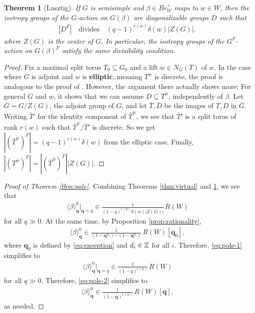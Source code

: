 \documentclass[a4paper,10pt,leqno]{amsart}
\theoremstyle{plain}
\theoremstyle{plain}
\newtheorem{thm}{Theorem}[subsection]
\theoremstyle{plain}
\theoremstyle{definition}
\theoremstyle{remark}
\newcommand{\dfemph}[1]{\textbf{#1}}
\newcommand{\Br}{\mathit{Br}}
\newcommand{\Q}{\bm{q}}
\newcommand{\Tr}[1]{\langle{#1}\rangle_{\Q}}
\begin{document}
\begin{thm}[Lusztig]\label{thm:isotropy}
If $G$ is semisimple and $\beta \in \Br_W^+$ maps to $w \in W$, then the isotropy groups of the $G$-action on $G(\beta)$ are diagonalizable groups $D$ such that 
\begin{align}
|D^F|
\quad\text{divides}\quad
(q - 1)^{r(w)} \delta(w)|Z(G)|,
\end{align}
where $Z(G)$ is the center of $G$.
In particular, the isotropy groups of the $G^F$-action on $G(\beta)^F$ satisfy the same divisibility condition.
\end{thm}

\begin{proof}
Fix a maximal split torus $T_0 \subseteq G_0$ and a lift $\dot{w} \in N_G(T)$ of $w$.
In the case where $G$ is adjoint and $w$ is \dfemph{elliptic}, meaning $T^w$ is discrete, the proof is analogous to the proof of \cite[Thm.\ 5.2]{lusztig_2011}.
However, the argument there actually shows more:
For general $G$ and $w$, it shows that we can assume $D \subseteq T^{\dot{w}}$, independently of $\beta$.
Let $\bar{G} = G/Z(G)$, the adjoint group of $G$, and let $\bar{T}, \bar{D}$ be the images of $T, D$ in $\bar{G}$.
Writing $\bar{T}'$ for the identity component of $\bar{T}^{\dot{w}}$, we see that $\bar{T}'$ is a split torus of rank $r(w)$ such that $\bar{T}^{\dot{w}}/\bar{T}'$ is discrete.
So we get $|(\bar{T}^{\dot{w}})^F| = (q - 1)^{r(w)}\delta(w)$ from the elliptic case.
Finally, $|(T^{\dot{w}})^F| = |(\bar{T}^{\dot{w}})^F||Z(G)|$.
\end{proof}

\begin{proof}[Proof of Theorem \ref{thm:pole}]
Combining Theorems \ref{thm:virtual} and \ref{thm:isotropy}, we see that 
\begin{align}\label{eq:pole-1}
\Tr{\beta}^0|_{\Q = q} \in \frac{1}{(1 - q)^{r(w)} \delta(w)|Z(G)|}\, R(W)
\end{align}
for all $q \gg 0$.
At the same time, by Proposition \ref{prop:rationality},
\begin{align}\label{eq:pole-2}
\Tr{\beta}^0 \in \frac{1}{(1 - \Q^{d_1}) \cdots (1 - \Q^{d_r})}\, R(W)[\Q_0],
\end{align}
where $\Q_0$ is defined by \eqref{eq:exception} and $d_i \in \mathbb{Z}$ for all $i$.
Therefore, \eqref{eq:pole-1} simplifies to
\begin{align}
\Tr{\beta}^0|_{\Q = q} \in \frac{1}{(1 - q)^{r(w)}}\, R(W)
\end{align}
for all $q \gg 0$.
Therefore, \eqref{eq:pole-2} simplifies to
\begin{align}
\Tr{\beta}^0 \in \frac{1}{(1 - \Q)^{r(w)}}\, R(W)[\Q],
\end{align}
as needed.
\end{proof}
\end{document}
